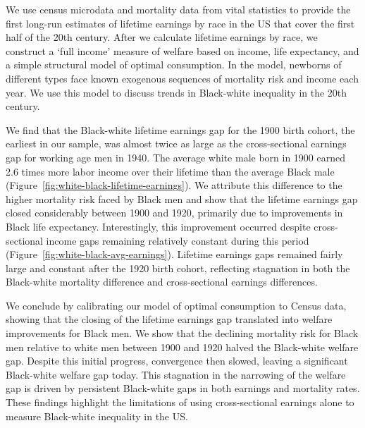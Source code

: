 \documentclass[12pt]{article}
\begin{document}
We use census microdata and mortality data from vital statistics to provide the first long-run estimates of lifetime earnings by race in the US that cover the first half of the 20th century. 
After we calculate lifetime earnings by race, we construct a `full income' measure of welfare based on income, life expectancy, and a simple structural model of optimal consumption. 
In the model, newborns of different types face known exogenous sequences of mortality risk and income each year.
We use this model to discuss trends in Black-white inequality in the 20th century. 


We find that the Black-white lifetime earnings gap for the 1900 birth cohort, the earliest in our sample, was almost twice as large as the cross-sectional earnings gap for working age men in 1940.
The average white male born in 1900 earned 2.6 times more labor income over their lifetime than the average Black male (Figure~\ref{fig:white-black-lifetime-earnings}).
We attribute this difference to the higher mortality risk faced by Black men and show that the lifetime earnings gap closed considerably between 1900 and 1920, primarily due to improvements in Black life expectancy. 
Interestingly, this improvement occurred despite cross-sectional income gaps remaining relatively constant during this period (Figure~\ref{fig:white-black-avg-earnings}).  
Lifetime earnings gaps remained fairly large and constant after the 1920 birth cohort, reflecting stagnation in both the Black-white mortality difference and cross-sectional earnings differences. 

We conclude by calibrating our model of optimal consumption to Census data, showing that the closing of the lifetime earnings gap translated into welfare improvements for Black men. 
We show that the declining mortality risk for Black men relative to white men between 1900 and 1920 halved the Black-white welfare gap. 
Despite this initial progress, convergence then slowed, leaving a significant Black-white welfare gap today. 
This stagnation in the narrowing of the welfare gap is driven by persistent Black-white gaps in both earnings and mortality rates.
These findings highlight the limitations of using cross-sectional earnings alone to measure Black-white inequality in the US.
\end{document}
